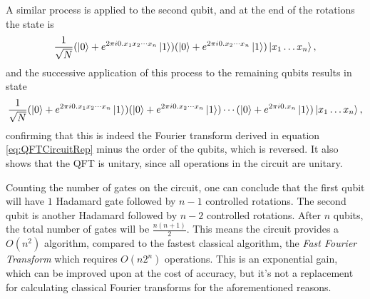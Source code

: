 \documentclass[../../dissertation.tex]{subfiles}
\begin{document}
A similar process is applied to the second qubit, and at the end of the rotations the state is
\begin{equation}
	\frac{1}{\sqrt{N}} ( \ket{0} + e^{2\pi i 0.x_1x_2\cdots x_n} \ket{1})  ( \ket{0} + e^{2\pi i 0.x_2\cdots x_n} \ket{1})\ket{x_1\dots x_n},
\end{equation}
and the successive application of this process to the remaining qubits results in state
\begin{equation}
	\frac{1}{\sqrt{N}} ( \ket{0} + e^{2\pi i 0.x_1x_2\cdots x_n} \ket{1})  ( \ket{0} + e^{2\pi i 0.x_2\cdots x_n} \ket{1})\cdots ( \ket{0} + e^{2\pi i 0.x_n} \ket{1})\ket{x_1\dots x_n},
\end{equation}
confirming that this is indeed the Fourier transform derived in equation \ref{eq:QFTCircuitRep} minus the order of the qubits, which is reversed. It also shows that the QFT is unitary, since all operations in the circuit are unitary.\par
Counting the number of gates on the circuit, one can conclude that the first qubit will have $1$ Hadamard gate followed by $n-1$ controlled rotations. The second qubit is another Hadamard followed by $n-2$ controlled rotations. After $n$ qubits, the total number of gates will be $\frac{n(n+1)}{2}$. This means the circuit provides a $O(n^2)$ algorithm, compared to the fastest classical algorithm, the \textit{Fast Fourier Transform} which requires $O(n2^n)$ operations. This is an exponential gain, which can be improved upon at the cost of accuracy, but it's not a replacement for calculating classical Fourier transforms for the aforementioned reasons. 
\end{document}
